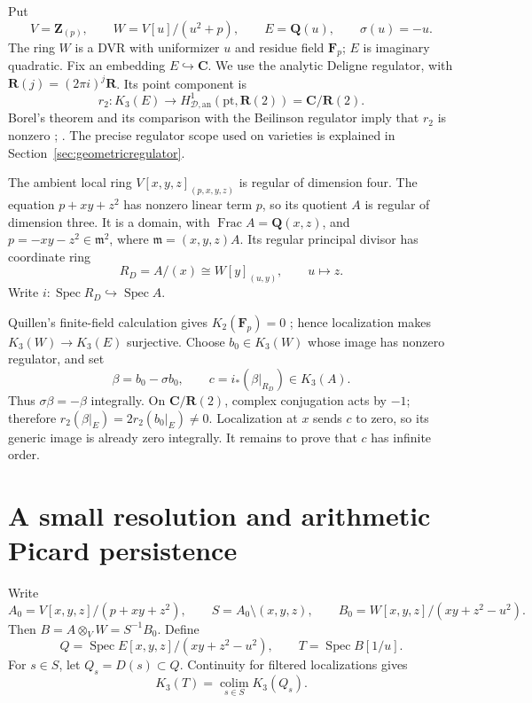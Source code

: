 \documentclass[11pt,a4paper]{article}
\theoremstyle{remark}
\newcommand{\Z}{\mathbf Z}
\newcommand{\Q}{\mathbf Q}
\newcommand{\R}{\mathbf R}
\newcommand{\C}{\mathbf C}
\newcommand{\F}{\mathbf F}
\newcommand{\m}{\mathfrak m}
\newcommand{\Spec}{\operatorname{Spec}}
\newcommand{\Frac}{\operatorname{Frac}}
\newcommand{\colim}{\operatorname*{colim}}
\newcommand{\HD}{H_{\mathcal D,\mathrm{an}}}
\begin{document}
Put
\[
 V=\Z_{(p)},\qquad W=V[u]/(u^2+p),\qquad E=\Q(u),\qquad
 \sigma(u)=-u.
\]
The ring \(W\) is a DVR with uniformizer \(u\) and residue field
\(\F_p\); \(E\) is imaginary quadratic. Fix an embedding
\(E\hookrightarrow\C\). We use the analytic Deligne regulator, with
\(\R(j)=(2\pi i)^j\R\). Its point component is
\[
 r_2:K_3(E)\longrightarrow
 \HD^1(\mathrm{pt},\R(2))=\C/\R(2).
\]
Borel's theorem and its comparison with the Beilinson regulator imply
that \(r_2\) is nonzero \cite[Proposition~12.2]{Borel};
\cite[Section~6, especially (6.4)]{BunkeTamme}.
The precise regulator scope used on varieties is explained in
Section~\ref{sec:geometricregulator}.

The ambient local ring \(V[x,y,z]_{(p,x,y,z)}\) is regular of
dimension four. The equation \(p+xy+z^2\) has nonzero linear term
\(p\), so its quotient \(A\) is regular of dimension three.
It is a domain, with \(\Frac A=\Q(x,z)\), and
\(p=-xy-z^2\in\m^2\), where \(\m=(x,y,z)A\).
Its regular principal divisor has coordinate ring
\[
 R_D=A/(x)\cong W[y]_{(u,y)},\qquad u\longmapsto z.
\]
Write \(i:\Spec R_D\hookrightarrow\Spec A\).

Quillen's finite-field calculation gives \(K_2(\F_p)=0\)
\cite{QuillenFinite}; hence localization makes
\(K_3(W)\to K_3(E)\) surjective. Choose \(b_0\in K_3(W)\)
whose image has nonzero regulator, and set
\begin{equation}\label{eq:geometriccoefficient}
 \beta=b_0-\sigma b_0,\qquad
 c=i_*(\beta|_{R_D})\in K_3(A).
\end{equation}
Thus \(\sigma\beta=-\beta\) integrally. On \(\C/\R(2)\), complex
conjugation acts by \(-1\); therefore
\(r_2(\beta|_E)=2r_2(b_0|_E)\ne0\).
Localization at \(x\) sends \(c\) to zero, so its generic image is
already zero integrally. It remains to prove that \(c\) has infinite
order.

\section{A small resolution and arithmetic Picard persistence}

Write
\[
 A_0=V[x,y,z]/(p+xy+z^2),\qquad
 S=A_0\setminus(x,y,z),\qquad
 B_0=W[x,y,z]/(xy+z^2-u^2).
\]
Then \(B=A\otimes_VW=S^{-1}B_0\). Define
\[
 Q=\Spec E[x,y,z]/(xy+z^2-u^2),\qquad T=\Spec B[1/u].
\]
For \(s\in S\), let \(Q_s=D(s)\subset Q\).
Continuity for filtered localizations
\cite[Chapter~IV, Section~6.4]{Weibel} gives
\begin{equation}\label{eq:geometriccontinuity}
 K_3(T)=\colim_{s\in S}K_3(Q_s).
\end{equation}
\end{document}
